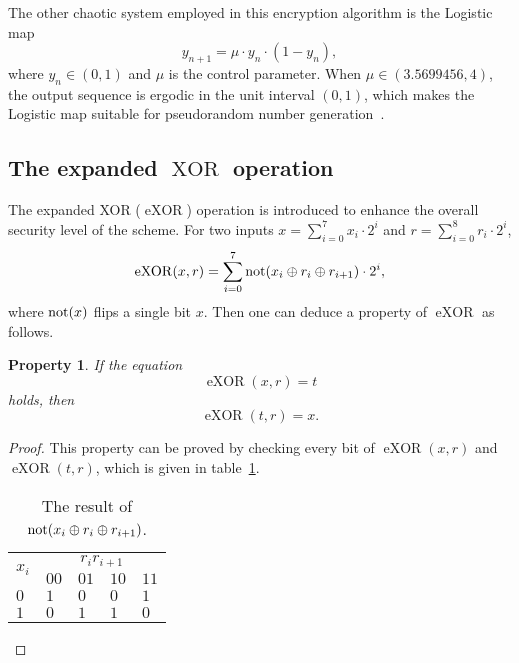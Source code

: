 \documentclass[3p,preprint,11pt]{elsarticle}
\newcommand\NOT{{\rm not}}
\newtheorem{property}{Property}
\DeclareMathOperator{\eXOR}{eXOR}
\DeclareMathOperator{\XOR}{XOR}
\begin{document}
The other chaotic system employed in this encryption algorithm is the Logistic map
\begin{equation*}
y_{n+1} = \mu \cdot y_{n} \cdot (1-y_n),
\end{equation*}
where $y_{n} \in (0, 1)$ and $\mu$ is the control parameter. When $\mu \in (3.5699456, 4)$, the output sequence
is ergodic in the unit interval $(0, 1)$, which makes the Logistic map suitable for pseudorandom
 number generation~\cite{Andrecut:LogisticasRan:IJMPB98}.

\subsection{The expanded $\XOR$ operation}
The expanded XOR ($\eXOR$) operation is introduced to enhance the overall
security level of the scheme. For two inputs $x=\sum_{i=0}^{7}x_{i}\cdot 2^i$ and $r=\sum_{i=0}^{8}r_i\cdot 2^i$,
\begin{equation*}
\eXOR(x,r) = \sum_{i=0}^{7} \NOT ( x_i \oplus r_i\oplus r_{i+1} ) \cdot2^i,
\end{equation*}
where $\NOT(x)$ flips a single bit $x$.
Then one can deduce a property of $\eXOR$ as follows.
\begin{property}
If the equation
\begin{equation*}
\eXOR(x, r)=t
\end{equation*}
holds, then
\begin{equation*}\eXOR(t, r)=x.\end{equation*}
\label{pro:property}
\end{property}
\begin{proof}
This property can be proved by checking every bit of $\eXOR(x, r)$ and $\eXOR(t, r)$, which is given in
table~\ref{tab:eXORresult}.
\begin{table}[!htb]
\centering
\caption{The result of $\NOT ( x_i \oplus r_i\oplus r_{i+1} )$.}
\begin{tabular}{ p{2.4cm}  p{2.4cm}  p{2.4cm}  p{2.4cm}  p{2.4cm}}
\hline\multirow{2}{20pt}{$x_i$}     & \multicolumn{4}{c}{$r_ir_{i+1}$} \\  \cline{2-5}
                                           & $00$    & $01$    &$10$     & $11$ \\
\hline      $0$                             & $1$     & $0$     & $0$    & $1$ \\
\hline      $1$                             & $0$     & $1$     & $1$     &$0$ \\
\hline
\end{tabular}
\label{tab:eXORresult}
\end{table}

\end{proof}
\end{document}
